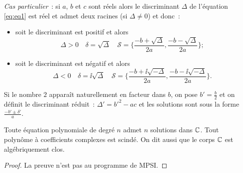 \emph{Cas particulier}~: si \(a\), \(b\) et \(c\) sont réels alors le 
discriminant \(\Delta\) de l'équation \eqref{eq:eq1} est réel et admet deux 
racines (si \(\Delta \neq 0\)) et donc~:
\begin{itemize}
    \item soit le discriminant est positif et alors
    \begin{equation}
        \Delta >0 \quad \delta=\sqrt{\Delta} \quad \mathcal{S} = \biggl\lbrace 
            \frac{-b+\sqrt{\Delta}}{2a} , \frac{-b-\sqrt{\Delta}}{2a} 
            \biggl\rbrace;
        \end{equation}
    \item soit le discriminant est négatif et alors
    \begin{equation}
        \Delta <0 \quad \delta=\ii\sqrt{\Delta} \quad \mathcal{S} = 
        \biggl\lbrace \frac{-b+\ii\sqrt{-\Delta}}{2a} , 
            \frac{-b-\ii\sqrt{-\Delta}}{2a} \biggl\rbrace.
        \end{equation}
\end{itemize}
Si le nombre \(2\) apparaît naturellement en facteur dans \(b\), on pose 
\(b'=\frac{b}{2}\) et on définit le discriminant réduit~: \(\Delta'=b'^2-ac\) et 
les solutions sont sous la forme \(\frac{-b'\pm \delta'}{a}\).
\begin{theo}
    Toute équation polynomiale de degré \(n\) admet \(n\) solutions dans \(\mathbb{C}\). 
    Tout polynôme à coefficients complexes est scindé. On dit aussi que le corps 
    \(\mathbb{C}\) est algébriquement clos.
\end{theo}
\begin{proof}
    La preuve n'est pas au programme de MPSI.
\end{proof}
